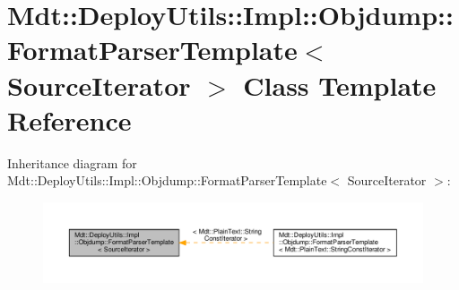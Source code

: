 \hypertarget{class_mdt_1_1_deploy_utils_1_1_impl_1_1_objdump_1_1_format_parser_template}{}\section{Mdt\+:\+:Deploy\+Utils\+:\+:Impl\+:\+:Objdump\+:\+:Format\+Parser\+Template$<$ Source\+Iterator $>$ Class Template Reference}
\label{class_mdt_1_1_deploy_utils_1_1_impl_1_1_objdump_1_1_format_parser_template}


Inheritance diagram for Mdt\+:\+:Deploy\+Utils\+:\+:Impl\+:\+:Objdump\+:\+:Format\+Parser\+Template$<$ Source\+Iterator $>$\+:
\nopagebreak
\begin{figure}[H]
\begin{center}
\leavevmode
\includegraphics[width=350pt]{class_mdt_1_1_deploy_utils_1_1_impl_1_1_objdump_1_1_format_parser_template__inherit__graph}
\end{center}
\end{figure}
